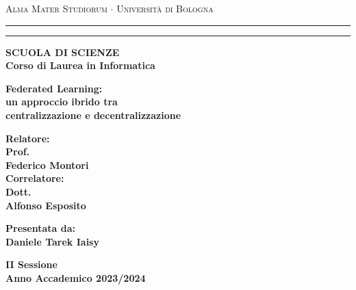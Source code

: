 \documentclass[12pt, a4paper]{report}
\begin{document}
\begin{titlepage}
\begin{center}
{{\Large{\textsc{Alma Mater Studiorum $\cdot$ Universit\`a di
Bologna}}}} \rule[0.1cm]{15.8cm}{0.1mm}
\rule[0.5cm]{15.8cm}{0.6mm}
{\small{\bf SCUOLA DI SCIENZE\\
Corso di Laurea in Informatica }}
\end{center}
\vspace{15mm}
\begin{center}
{\LARGE{\bf Federated Learning:}}\\
\vspace{3mm}
{\LARGE{\bf un approccio ibrido tra}}\\
\vspace{3mm}
{\LARGE{\bf centralizzazione e decentralizzazione}}\\
\end{center}
\vspace{40mm}
\par
\noindent
\begin{minipage}[t]{0.47\textwidth}
    \large{\bf Relatore:\\
    Prof.\\
    Federico Montori\\[1em]
    Correlatore:\\
    Dott.\\
    Alfonso Esposito}
\end{minipage}
\hfill
\begin{minipage}[t]{0.47\textwidth}\raggedleft
    \large{\bf Presentata da:\\
    Daniele Tarek Iaisy}
\end{minipage}
\vspace{20mm}
\begin{center}
{\large{\bf II Sessione\\
Anno Accademico 2023/2024}}
\end{center}
\end{titlepage}
\end{document}

